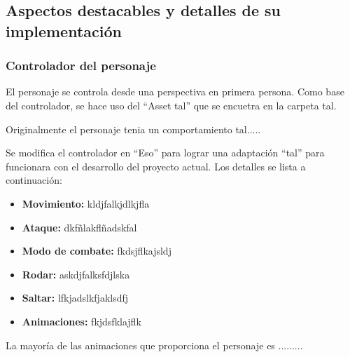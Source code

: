 \subsection{Aspectos destacables y detalles de su implementación}

\subsubsection{Controlador del personaje}
El personaje se controla desde una perspectiva en primera persona. Como base del controlador,  se hace uso del ``Asset tal'' que se encuetra en la carpeta tal.

Originalmente el personaje tenia un comportamiento tal.....

Se modifica el controlador en ``Eso'' para lograr una adaptación ``tal'' para funcionara con el desarrollo del proyecto actual. Los detalles se lista a continuación:

\begin{itemize}
	\item \textbf{Movimiento:} kldjfalkjdlkjfla
	\item \textbf{Ataque:} dkfñlakflñadskfal
	\item \textbf{Modo de combate:} fkdsjflkajsldj
	\item \textbf{Rodar:} askdjfalksfdjlska
	\item \textbf{Saltar:} lfkjadslkfjaklsdfj
	\item \textbf{Animaciones:} fkjdsfklajflk
\end{itemize}

La mayoría de las animaciones que proporciona el personaje es .........